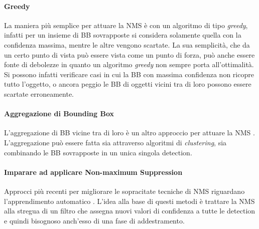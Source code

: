 \paragraph{Greedy}
La maniera più semplice per attuare la \ac{NMS} è con un algoritmo di tipo \textit{greedy}, infatti per un insieme di \ac{BB} sovrapposte si considera solamente quella con la confidenza massima, mentre le altre vengono scartate. La sua semplicità, che da un certo punto di vista può essere vista come un punto di forza, può anche essere fonte di debolezze in quanto un algoritmo \textit{greedy} non sempre porta all'ottimalità. Si possono infatti verificare casi in cui la \ac{BB} con massima confidenza non ricopre tutto l'oggetto, o ancora peggio le \ac{BB} di oggetti vicini tra di loro possono essere scartate erroneamente.


\paragraph{Aggregazione di Bounding Box}
L'aggregazione di \ac{BB} vicine tra di loro è un altro approccio per attuare la \ac{NMS} \cite{viola2001rapid, sermanet2013overfeat, rothe2014non, mrowca2015spatial}. L'aggregazione può essere fatta sia attraverso algoritmi di \textit{clustering}, sia combinando le \ac{BB} sovrapposte in un unica singola detection. 


\paragraph{Imparare ad applicare Non-maximum Suppression}
Approcci più recenti per migliorare le sopracitate tecniche di \ac{NMS} riguardano l'apprendimento automatico \cite{wan2015end, desai2011discriminative, hosang2017learning, henderson2016end}. L'idea alla base di questi metodi è trattare la \ac{NMS} alla stregua di un filtro che assegna nuovi valori di confidenza a tutte le detection e quindi bisognoso anch'esso di una fase di addestramento. 

